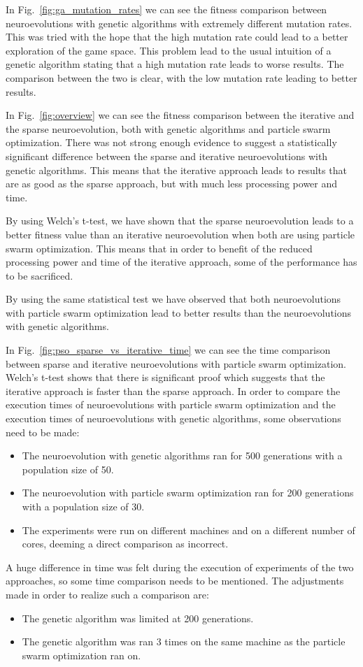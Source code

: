 \documentclass[conference]{IEEEtran}
\begin{document}
In Fig.~\ref{fig:ga_mutation_rates} we can see the fitness comparison between neuroevolutions with genetic algorithms
with extremely different mutation rates.
This was tried with the hope that the high mutation rate could lead to a better exploration of the game space.
This problem lead to the usual intuition of a genetic algorithm stating that a high mutation rate leads to worse results.
The comparison between the two is clear, with the low mutation rate leading to better results.

In Fig.~\ref{fig:overview} we can see the fitness comparison between the iterative and the sparse neuroevolution,
both with genetic algorithms and particle swarm optimization.
There was not strong enough evidence to suggest a statistically significant difference between the sparse and iterative
neuroevolutions with genetic algorithms.
This means that the iterative approach leads to results that are as good as the sparse approach, but with much less
processing power and time.

By using Welch's t-test, we have shown that the sparse neuroevolution leads to a better fitness value than an iterative
neuroevolution when both are using particle swarm optimization.
This means that in order to benefit of the reduced processing power and time of the iterative approach,
some of the performance has to be sacrificed.

By using the same statistical test we have observed that both neuroevolutions with particle swarm optimization lead
to better results than the neuroevolutions with genetic algorithms.

In Fig.~\ref{fig:pso_sparse_vs_iterative_time} we can see the time comparison between sparse and iterative neuroevolutions
with particle swarm optimization.
Welch's t-test shows that there is significant proof which suggests that the iterative approach is faster than the
sparse approach.
In order to compare the execution times of neuroevolutions with particle swarm optimization and the execution times
of neuroevolutions with genetic algorithms, some observations need to be made:
\begin{itemize}
    \item The neuroevolution with genetic algorithms ran for 500 generations with a population size of 50.
    \item The neuroevolution with particle swarm optimization ran for 200 generations with a population size of 30.
    \item The experiments were run on different machines and on a different number of cores, deeming a direct comparison as incorrect.
\end{itemize}
A huge difference in time was felt during the execution of experiments of the two approaches,
so some time comparison needs to be mentioned.
The adjustments made in order to realize such a comparison are:
\begin{itemize}
    \item The genetic algorithm was limited at 200 generations.
    \item The genetic algorithm was ran 3 times on the same machine as the particle swarm optimization ran on.
\end{itemize}
\end{document}
